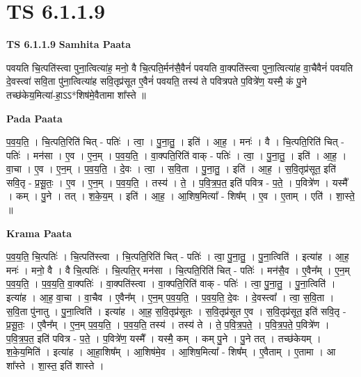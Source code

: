 \documentclass[17pt]{extarticle}
\begin{document}
\section{ TS 6.1.1.9 }

\textbf{TS 6.1.1.9 } \newline
\textbf{Samhita Paata} \newline

पवयति चि॒त्पति॑स्त्वा पुना॒त्वित्या॑ह॒ मनो॒ वै चि॒त्पति॒र्मन॑सै॒वैनं॑ पवयति वा॒क्पति॑स्त्वा पुना॒त्वित्या॑ह वा॒चैवैनं॑ पवयति दे॒वस्त्वा॑ सवि॒ता पु॑ना॒त्वित्या॑ह सवि॒तृप्र॑सूत ए॒वैनं॑ पवयति॒ तस्य॑ ते पवित्रपते प॒वित्रे॑ण॒ यस्मै॒ कं पु॒ने तच्छ॑केय॒मित्या॑-हा॒ऽऽ*शिष॑मे॒वैतामा शा᳚स्ते ॥ \newline

\textbf{Pada Paata} \newline

प॒व॒य॒ति॒ । चि॒त्पति॒रिति॑ चित् - पतिः॑ । त्वा॒ । पु॒ना॒तु॒ । इति॑ । आ॒ह॒ । मनः॑ । वै । चि॒त्पति॒रिति॑ चित् - पतिः॑ । मन॑सा । ए॒व । ए॒न॒म् । प॒व॒य॒ति॒ । वा॒क्पति॒रिति॑ वाक् - पतिः॑ । त्वा॒ । पु॒ना॒तु॒ । इति॑ । आ॒ह॒ । वा॒चा । ए॒व । ए॒न॒म् । प॒व॒य॒ति॒ । दे॒वः । त्वा॒ । स॒वि॒ता । पु॒ना॒तु॒ । इति॑ । आ॒ह॒ । स॒वि॒तृप्र॑सूत॒ इति॑ सवि॒तृ - प्र॒सू॒तः॒ । ए॒व । ए॒न॒म् । प॒व॒य॒ति॒ । तस्य॑ । ते॒ । प॒वि॒त्र॒प॒त॒ इति॑ पवित्र - प॒ते॒ । प॒वित्रे॑ण । यस्मै᳚ । कम् । पु॒ने । तत् । श॒के॒य॒म् । इति॑ । आ॒ह॒ । आ॒शिष॒मित्या᳚ - शिष᳚म् । ए॒व । ए॒ताम् । एति॑ । शा॒स्ते॒ ॥  \newline


\textbf{Krama Paata} \newline

प॒व॒य॒ति॒ चि॒त्पतिः॑ । चि॒त्पति॑स्त्वा । चि॒त्पति॒रिति॑ चित् - पतिः॑ । त्वा॒ पु॒ना॒तु॒ । पु॒ना॒त्विति॑ । इत्या॑ह । आ॒ह॒ मनः॑ । मनो॒ वै । वै चि॒त्पतिः॑ । चि॒त्पति॒र् मन॑सा । चि॒त्पति॒रिति॑ चित् - पतिः॑ । मन॑सै॒व । ए॒वैन᳚म् । ए॒न॒म् प॒व॒य॒ति॒ । प॒व॒य॒ति॒ वा॒क्पतिः॑ । वा॒क्पति॑स्त्वा । वा॒क्पति॒रिति॑ वाक् - पतिः॑ । त्वा॒ पु॒ना॒तु॒ । पु॒ना॒त्विति॑ । इत्या॑ह । आ॒ह॒ वा॒चा । वा॒चैव । ए॒वैन᳚म् । ए॒न॒म् प॒व॒य॒ति॒ । प॒व॒य॒ति॒ दे॒वः । दे॒वस्त्वा᳚ । त्वा॒ स॒वि॒ता । स॒वि॒ता पु॑नातु । पु॒ना॒त्विति॑ । इत्या॑ह । आ॒ह॒ स॒वि॒तृप्र॑सूतः । स॒वि॒तृप्र॑सूत ए॒व । स॒वि॒तृप्र॑सूत॒ इति॑ सवि॒तृ - प्र॒सू॒तः॒ । ए॒वैन᳚म् । ए॒न॒म् प॒व॒य॒ति॒ । प॒व॒य॒ति॒ तस्य॑ । तस्य॑ ते । ते॒ प॒वि॒त्र॒प॒ते॒ । प॒वि॒त्र॒प॒ते॒ प॒वित्रे॑ण । प॒वि॒त्र॒प॒त॒ इति॑ पवित्र - प॒ते॒ । प॒वित्रे॑ण॒ यस्मै᳚ । यस्मै॒ कम् । कम् पु॒ने । पु॒ने तत् । तच्छ॑केयम् । श॒के॒य॒मिति॑ । इत्या॑ह । आ॒हा॒शिष᳚म् । आ॒शिष॑मे॒व । आ॒शिष॒मित्या᳚ - शिष᳚म् । ए॒वैताम् । ए॒तामा । आ शा᳚स्ते । शा॒स्त॒ इति॑ शास्ते । \newline
\end{document}
